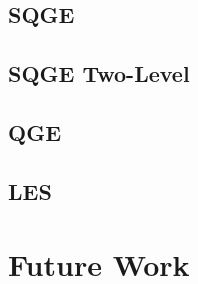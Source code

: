\documentclass[proposal]{VTthesis}
\begin{document}
  \section{SQGE} \label{sec:SQGETests}
  
  \section{SQGE Two-Level} \label{sec:SQGE2LTests}
  
  \section{QGE} \label{sec:QGETests}
  
  \section{LES} \label{sec:LESTests}
  

  \chapter{Future Work} \label{ch:Future}
  

  
  

\end{document}
